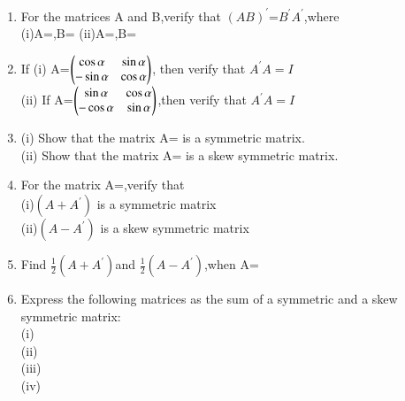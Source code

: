 \begin{enumerate}[label=\arabic*.,ref=\thesubsection.\theenumi]
\item For the matrices A and B,verify that $(AB)^{'}$=$B^{'}A^{'}$,where\\
(i)A=,B= (ii)A=,B=
\item If (i)  A=$\begin{pmatrix}\cos\alpha &\sin\alpha\\-\sin\alpha &\cos\alpha\end{pmatrix}$, then verify that $A^{'}A=I$\\
        (ii) If A=$\begin{pmatrix}\sin\alpha &\cos\alpha\\-\cos\alpha &\sin\alpha\end{pmatrix}$,then verify that $A^{'}A=I$\\
\solution

  \item (i) Show that the matrix A= is a symmetric matrix.\\
  (ii) Show that the matrix A= is a skew symmetric matrix.\\
  \item For the matrix A=,verify that\\
  (i)$(A+A^{'})$ is a symmetric matrix\\
  (ii)$(A-A^{'})$ is a skew symmetric matrix\\
  
  \item Find $\frac{1}{2}(A+A^{'}) $and $\frac{1}{2}(A-A^{'})$,when A=\\
  \item Express the following matrices as the sum of a symmetric and a skew symmetric matrix:\\
  (i)  \\(ii)  \\
  (iii) \\ (iv) \\
  

\end{enumerate}
